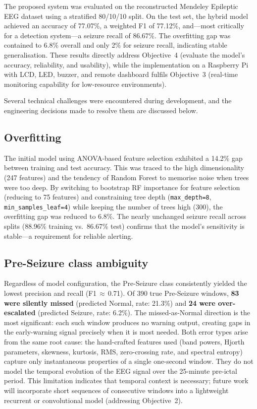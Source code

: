 \documentclass[12pt, a4paper]{report}
\begin{document}
The proposed system was evaluated on the reconstructed Mendeley Epileptic
EEG dataset using a stratified 80/10/10 split. On the test set, the hybrid
model achieved an accuracy of 77.07\%, a weighted F1 of 77.12\%, and---most
critically for a detection system---a seizure recall of 86.67\%. The
overfitting gap was contained to 6.8\% overall and only 2\% for seizure
recall, indicating stable generalisation. These results directly address
Objective~4 (evaluate the model's accuracy, reliability, and usability),
while the implementation on a Raspberry Pi with LCD, LED, buzzer, and
remote dashboard fulfils Objective~3 (real-time monitoring capability for
low-resource environments).

Several technical challenges were encountered during development, and the
engineering decisions made to resolve them are discussed below.

\subsection*{Overfitting}

The initial model using ANOVA-based feature selection exhibited a 14.2\%
gap between training and test accuracy. This was traced to the high
dimensionality (247 features) and the tendency of Random Forest to memorise
noise when trees were too deep. By switching to bootstrap RF importance for
feature selection (reducing to 75 features) and constraining tree depth
(\texttt{max\_depth=8}, \texttt{min\_samples\_leaf=4}) while keeping the
number of trees high (300), the overfitting gap was reduced to 6.8\%. The
nearly unchanged seizure recall across splits (88.96\% training vs.\
86.67\% test) confirms that the model's sensitivity is stable---a
requirement for reliable alerting.

\subsection*{Pre-Seizure class ambiguity}

Regardless of model configuration, the Pre-Seizure class consistently
yielded the lowest precision and recall (F1\,$\approx$\,0.71). Of 390
true Pre-Seizure windows, \textbf{83 were silently missed} (predicted
Normal, rate: 21.3\%) and \textbf{24 were over-escalated} (predicted
Seizure, rate: 6.2\%). The missed-as-Normal direction is the most
significant: each such window produces no warning output, creating gaps
in the early-warning signal precisely when it is most needed. Both error
types arise from the same root cause: the hand-crafted features used
(band powers, Hjorth parameters, skewness, kurtosis, RMS, zero-crossing
rate, and spectral entropy) capture only instantaneous properties of a
single one-second window. They do not model the temporal evolution of the
EEG signal over the 25-minute pre-ictal period. This limitation indicates
that temporal context is necessary; future work will incorporate short
sequences of consecutive windows into a lightweight recurrent or
convolutional model (addressing Objective~2).
\end{document}
